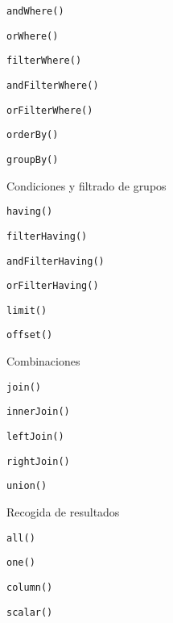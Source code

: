 \begin{longenum}
\begin{longenum}
\begin{longenum}
\begin{longenum}
\begin{longenum}
                    \item \texttt{andWhere()}
                    \item \texttt{orWhere()}
                    \item \texttt{filterWhere()}
                    \item \texttt{andFilterWhere()}
                    \item \texttt{orFilterWhere()}
                \end{longenum}
                \item \texttt{orderBy()}
                \item \texttt{groupBy()}
                \item Condiciones y filtrado de grupos
                \begin{longenum}
                    \item \texttt{having()}
                    \item \texttt{filterHaving()}
                    \item \texttt{andFilterHaving()}
                    \item \texttt{orFilterHaving()}
                \end{longenum}
                \item \texttt{limit()}
                \item \texttt{offset()}
                \item Combinaciones
                \begin{longenum}
                    \item \texttt{join()}
                    \item \texttt{innerJoin()}
                    \item \texttt{leftJoin()}
                    \item \texttt{rightJoin()}
                \end{longenum}
                \item \texttt{union()}
            \end{longenum}
            \item Recogida de resultados
            \begin{longenum}
                \item \texttt{all()}
                \item \texttt{one()}
                \item \texttt{column()}
                \item \texttt{scalar()}

\end{longenum}
\end{longenum}
\end{longenum}
\end{longenum}
